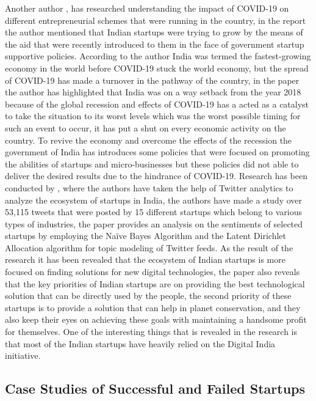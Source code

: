 \documentclass[12pt]{article}
\begin{document}
Another author \citep{yadav2021impact}, has researched understanding the impact of COVID-19 on different entrepreneurial schemes that were running in the country, in the report the author mentioned that Indian startups were trying to grow by the means of the aid that were recently introduced to them in the face of government startup supportive policies. According to the author India was termed the fastest-growing economy in the world before COVID-19 stuck the world economy, but the spread of COVID-19 has made a turnover in the pathway of the country, in the paper the author has highlighted that India was on a way setback from the year 2018 because of the global recession and effects of COVID-19 has a acted as a catalyst to take the situation to its worst levels which was the worst possible timing for such an event to occur, it has put a shut on every economic activity on the country. To revive the economy and overcome the effects of the recession the government of India has introduces some policies that were focused on promoting the abilities of startups and micro-businesses but these policies did not able to deliver the desired results due to the hindrance of COVID-19. 
Research has been conducted by \citep{singh2020analyzing}, where the authors have taken the help of Twitter analytics to analyze the ecosystem of startups in India, the authors have made a study over 53,115 tweets that were posted by 15 different startups which belong to various types of industries, the paper provides an analysis on the sentiments of selected startups by employing the Naïve Bayes Algorithm and the Latent Dirichlet Allocation algorithm for topic modeling of Twitter feeds. As the result of the research it has been revealed that the ecosystem of Indian startups is more focused on finding solutions for new digital technologies, the paper also reveals that the key priorities of Indian startups are on providing the best technological solution that can be directly used by the people, the second priority of these startups is to provide a solution that can help in planet conservation, and they also keep their eyes on achieving these goals with maintaining a handsome profit for themselves. One of the interesting things that is revealed in the research is that most of the Indian startups have heavily relied on the Digital India initiative. 

\subsection{Case Studies of Successful and Failed Startups}
\end{document}
